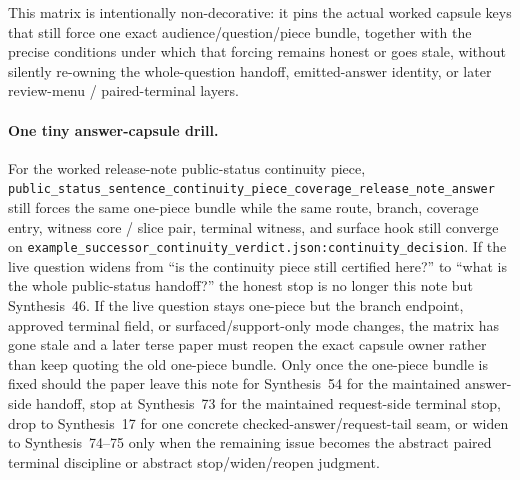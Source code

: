 \documentclass[11pt]{article}
\begin{document}
This matrix is intentionally non-decorative: it pins the actual worked capsule keys that still force one exact audience/question/piece bundle, together with the precise conditions under which that forcing remains honest or goes stale, without silently re-owning the whole-question handoff, emitted-answer identity, or later review-menu / paired-terminal layers.\cite{series:workedexample}

\paragraph{One tiny answer-capsule drill.}
For the worked release-note public-status continuity piece, \nolinkurl{public_status_sentence_continuity_piece_coverage_release_note_answer} still forces the same one-piece bundle while the same route, branch, coverage entry, witness core / slice pair, terminal witness, and surface hook still converge on \nolinkurl{example_successor_continuity_verdict.json:continuity_decision}. If the live question widens from ``is the continuity piece still certified here?'' to ``what is the whole public-status handoff?'' the honest stop is no longer this note but Synthesis~46. If the live question stays one-piece but the branch endpoint, approved terminal field, or surfaced/support-only mode changes, the matrix has gone stale and a later terse paper must reopen the exact capsule owner rather than keep quoting the old one-piece bundle. Only once the one-piece bundle is fixed should the paper leave this note for Synthesis~54 for the maintained answer-side handoff, stop at Synthesis~73 for the maintained request-side terminal stop, drop to Synthesis~17 for one concrete checked-answer/request-tail seam, or widen to Synthesis~74--75 only when the remaining issue becomes the abstract paired terminal discipline or abstract stop/widen/reopen judgment.\cite{series:workedexample}
\end{document}
